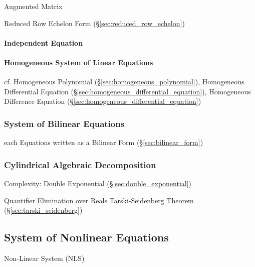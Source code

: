 Augmented Matrix

Reduced Row Echelon Form (\S\ref{sec:reduced_row_echelon})



\paragraph{Independent Equation}\label{sec:independent_equation}\hfill

\paragraph{Homogeneous System of Linear Equations}\hfill
\label{sec:homogeneous_linear_equation_system}

cf. Homogeneous Polynomial (\S\ref{sec:homogeneous_polynomial}), Homogeneous
Differential Equation (\S\ref{sec:homogeneous_differential_equation}),
Homogeneous Difference Equation (\S\ref{sec:homogeneous_differential_equation})



\subsubsection{System of Bilinear Equations}\label{sec:bilinear_equation_system}

each Equations written as a Bilinear Form (\S\ref{sec:bilinear_form})



\subsubsection{Cylindrical Algebraic Decomposition}
\label{sec:cylindrical_algebraic_decomposition}

Complexity: Double Exponential (\S\ref{sec:double_exponential})

Quantifier Elimination over Reals \fist Tarski-Seidenberg Theorem
(\S\ref{sec:tarski_seidenberg})



\subsection{System of Nonlinear Equations}\label{sec:nonlinear_equation_system}

Non-Linear System (NLS)

